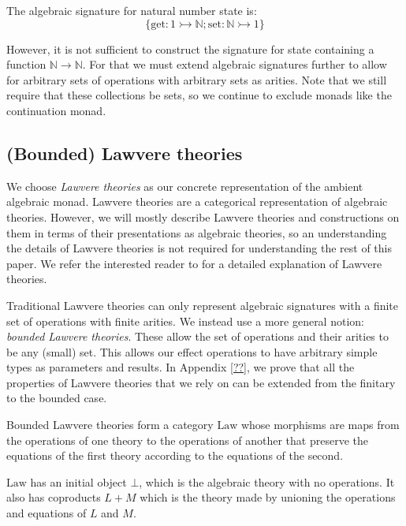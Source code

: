 \documentclass[acmsmall, screen, nonacm]{acmart}
\theoremstyle{definition}
\newcommand{\nat}{\mathbb{N}}
\newcommand{\initial}{\bot}
\newcommand{\lawc}{\mathrm{Law}}
\newcommand{\types}{\mathrel{:}}
\begin{document}
\begin{example}
  The algebraic signature for natural number state is:
  \begin{equation*}
    \{ \mathrm{get} \types 1 \rightarrowtail \nat; \mathrm{set} \types \nat \rightarrowtail 1 \}
  \end{equation*}
\end{example}

However, it is not sufficient to construct the signature for state
containing a function $\nat \rightarrow \nat$. For that we must extend
algebraic signatures further to allow for arbitrary sets of operations
with arbitrary sets as arities. Note that we still require that these
collections be sets, so we continue to exclude monads like the
continuation monad.

\subsection{(Bounded) Lawvere theories}

We choose \emph{Lawvere theories} as our concrete representation of the
ambient algebraic monad. Lawvere theories are a categorical
representation of algebraic theories. However, we will mostly describe
Lawvere theories and constructions on them in terms of their
presentations as algebraic theories, so an understanding the details of
Lawvere theories is not required for understanding the rest of this
paper. We refer the interested reader to \cite{??} for a detailed
explanation of Lawvere theories.

Traditional Lawvere theories can only represent algebraic signatures
with a finite set of operations with finite arities. We instead use a
more general notion: \emph{bounded Lawvere theories}. These allow the
set of operations and their arities to be any (small) set. This allows
our effect operations to have arbitrary simple types as parameters and
results. In Appendix \ref{??}, we prove that all the properties of
Lawvere theories that we rely on can be extended from the finitary to
the bounded case.

Bounded Lawvere theories form a category $\lawc$ whose morphisms are
maps from the operations of one theory to the operations of another that
preserve the equations of the first theory according to the equations of
the second.

$\lawc$ has an initial object $\initial$, which is the algebraic theory
with no operations. It also has coproducts $L + M$ which is the theory
made by unioning the operations and equations of $L$ and $M$.
\end{document}

